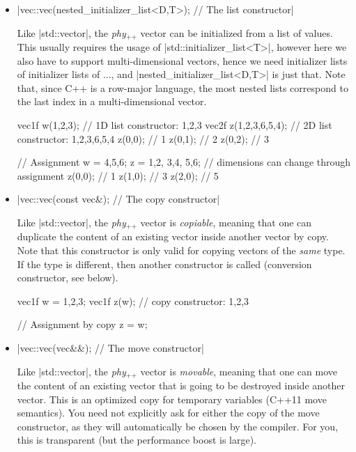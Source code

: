 \documentclass[12pt,a4paper]{report}
\newcommand{\phypp}{\textit{phy}$_{\text{++}}$\xspace}
\newcommand{\stdvec}{\cppinline|std::vector|\xspace}
\newenvironment{example}
{
    \begin{mdframed}[style=example,frametitle={Example}]
}
{
    \end{mdframed}
}
\begin{document}
\begin{itemize}
\item \cppinline|vec::vec(nested_initializer_list<D,T>); // The list constructor|

Like \stdvec, the \phypp vector can be initialized from a list of values. This usually requires the usage of \cppinline|std::initializer_list<T>|, however here we also have to support multi-dimensional vectors, hence we need initializer lists of initializer lists of ..., and \cppinline|nested_initializer_list<D,T>| is just that. Note that, since C++ is a row-major language, the most nested lists correspond to the last index in a multi-dimensional vector.

\begin{example}
\begin{cppcode}
vec1f w({1,2,3}); // 1D list constructor: {1,2,3}
vec2f z({{1,2,3},{6,5,4}}); // 2D list constructor: {{1,2,3},{6,5,4}}
z(0,0); // 1
z(0,1); // 2
z(0,2); // 3

// Assignment
w = {4,5,6};
z = {{1,2}, {3,4}, {5,6}}; // dimensions can change through assignment
z(0,0); // 1
z(1,0); // 3
z(2,0); // 5
\end{cppcode}
\end{example}

\item \cppinline|vec::vec(const vec&); // The copy constructor|

Like \stdvec, the \phypp vector is \emph{copiable}, meaning that one can duplicate the content of an existing vector inside another vector by copy. Note that this constructor is only valid for copying vectors of the \emph{same} type. If the type is different, then another constructor is called (conversion constructor, see below).

\begin{example}
\begin{cppcode}
vec1f w = {1,2,3};
vec1f z(w); // copy constructor: {1,2,3}

// Assignment by copy
z = w;
\end{cppcode}
\end{example}

\item \cppinline|vec::vec(vec&&); // The move constructor|

Like \stdvec, the \phypp vector is \emph{movable}, meaning that one can move the content of an existing vector that is going to be destroyed inside another vector. This is an optimized copy for temporary variables (C++11 move semantics). You need not explicitly ask for either the copy of the move constructor, as they will automatically be chosen by the compiler. For you, this is transparent (but the performance boost is large).


\end{itemize}
\end{document}
